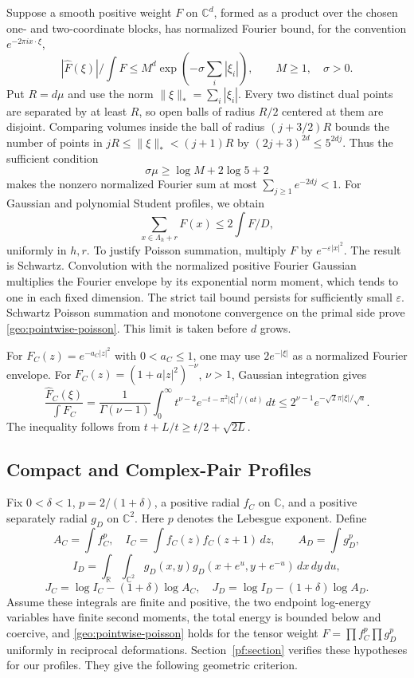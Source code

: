Suppose a smooth positive weight $F$ on $\mathbb C^d$, formed as a product
over the chosen one- and two-coordinate blocks, has normalized
Fourier bound, for the convention $e^{-2\pi i x\cdot\xi}$,
\[
 |\widehat F(\xi)|/\int F\le M^d
                  \exp\left(-\sigma\sum_i|\xi_i|\right),
 \qquad M\ge1,\quad \sigma>0.
\]
Put $R=d\mu$ and use the norm $\|\xi\|_*=\sum_i|\xi_i|$.
Every two distinct dual points are separated by at least $R$, so open
balls of radius $R/2$ centered at them are disjoint. Comparing volumes
inside the ball of radius $(j+3/2)R$ bounds the number of points in
$jR\le\|\xi\|_*<(j+1)R$ by
$(2j+3)^{2d}\le5^{2dj}$. Thus the sufficient condition
\begin{equation}\label{geo:poisson-condition}
 \sigma\mu\ge\log M+2\log5+2
\end{equation}
makes the nonzero normalized Fourier sum at most
$\sum_{j\ge1}e^{-2dj}<1$.
For Gaussian and polynomial Student profiles, we obtain
\begin{equation}\label{geo:pointwise-poisson}
 \sum_{x\in\Lambda_h+r}F(x)\le2\int F/D,
\end{equation}
uniformly in $h,r$. To justify Poisson summation, multiply $F$ by
$e^{-\varepsilon|x|^2}$. The result is Schwartz. Convolution with the
normalized positive Fourier Gaussian multiplies the Fourier envelope by
its exponential norm moment, which tends to one in each fixed dimension.
The strict tail bound persists for sufficiently small $\varepsilon$.
Schwartz Poisson summation and monotone convergence on the primal side
prove \eqref{geo:pointwise-poisson}. This limit is taken before $d$ grows.

For $F_C(z)=e^{-a_C|z|^2}$ with $0<a_C\le1$, one may use
$2e^{-|\xi|}$ as a normalized Fourier envelope. For
$F_C(z)=(1+a|z|^2)^{-\nu}$, $\nu>1$, Gaussian integration gives
\[
 \frac{\widehat F_C(\xi)}{\int F_C}
 =\frac1{\Gamma(\nu-1)}\int_0^\infty
 t^{\nu-2}e^{-t-\pi^2|\xi|^2/(at)}\,dt
 \le2^{\nu-1}e^{-\sqrt2\pi|\xi|/\sqrt a}.
\]
The inequality follows from $t+L/t\ge t/2+\sqrt{2L}$.

\subsection{Compact and Complex-Pair Profiles}

Fix $0<\delta<1$, $p=2/(1+\delta)$, a positive radial $f_C$ on $\mathbb C$,
and a positive separately radial $g_D$ on $\mathbb C^2$. Here $p$ denotes
the Lebesgue exponent. Define
\[
 A_C=\int f_C^p,\quad I_C=\int f_C(z)f_C(z+1)\,dz,
 \qquad A_D=\int g_D^p,
\]
\[
 I_D=\int_{\mathbb R}\int_{\mathbb C^2}
 g_D(x,y)g_D(x+e^u,y+e^{-u})\,dx\,dy\,du,
\]
\[
 J_C=\log I_C-(1+\delta)\log A_C,
 \quad J_D=\log I_D-(1+\delta)\log A_D.
\]
Assume these integrals are finite and positive, the two endpoint log-energy
variables have finite second moments, the total energy is bounded below
and coercive, and \eqref{geo:pointwise-poisson} holds for the tensor
weight $F=\prod f_C^p\prod g_D^p$ uniformly in reciprocal deformations.
Section~\ref{pf:section} verifies these hypotheses for our profiles. They
give the following geometric criterion.


